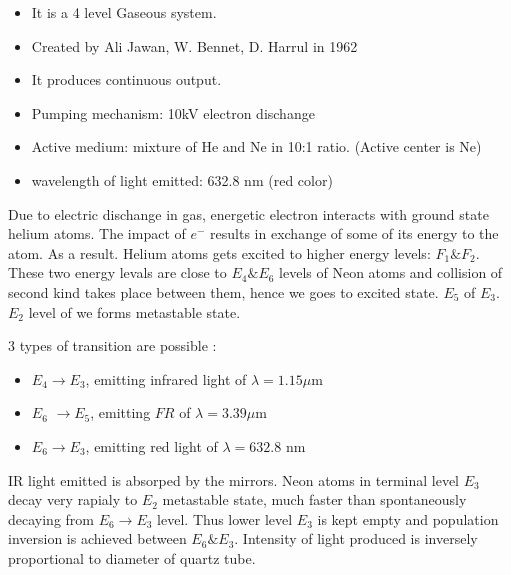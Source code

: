 \documentclass[12pt, a4paper]{article}
\begin{document}

\begin{itemize}
	\item It is a 4 level Gaseous system.
	\item Created by Ali Jawan, W. Bennet, D. Harrul in 1962
	\item It produces continuous output.
	\item Pumping mechanism: 10kV electron dischange
	\item Active medium: mixture of He and Ne in 10:1 ratio. (Active center is Ne)
	\item wavelength of light emitted: 632.8 nm (red color)
\end{itemize}

Due to electric dischange in gas, energetic electron interacts with ground state helium atoms. The impact of $e^{-}$ results in exchange of some of its energy to the atom. As a result. Helium atoms gets excited to higher energy levels: $F_{1} \& F_{2}$. These two energy levals are close to $E_{4} \& E_{6}$ levels of Neon atoms and collision of second kind takes place between them, hence we goes to excited state. $E_{5}$ of $E_{3}$. $E_2$ level of we forms metastable state.

3 types of transition are possible :

\begin{itemize}
	\item $E_{4} \rightarrow E_{3}$, emitting infrared light of $\lambda=1.15 \mu \mathrm{m}$
	\item $E_6$ $\rightarrow E_5$, emitting $F R$ of $\lambda = 3.39 \mu \mathrm{m}$
	\item $E_6 \rightarrow E_3$, emitting red light of $\lambda = 632.8$ nm
\end{itemize}

IR light emitted is absorped by the mirrors. Neon atoms in terminal level $E_{3}$ decay very rapialy to $E_{2}$ metastable state, much faster than spontaneously decaying from $E_{6} \rightarrow E_{3}$ level. Thus lower level $E_3$ is kept empty and population inversion is achieved between $E_{6} \& E_{3}$. Intensity of light produced is inversely proportional to diameter of quartz tube.
\bigskip

\resizebox{1\textwidth}{!}{
	
}

\end{document}
